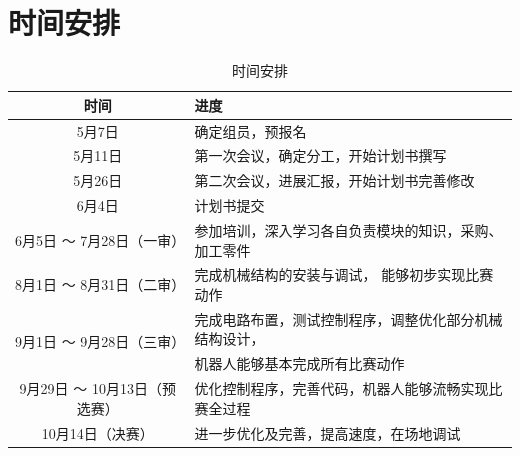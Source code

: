 \documentclass[10pt]{ctexart}
\begin{document}
\clearpage
\section{时间安排}

\begin{table}[H]
    \centering
    \caption{时间安排}
    \begin{tabular}{cl}
        \toprule
        时间                                   & {\centering 进度}             \\
        \midrule
        5月7日                                 & 确定组员，预报名                    \\
        5月11日                                & 第一次会议，确定分工，开始计划书撰写          \\
        5月26日                                & 第二次会议，进展汇报，开始计划书完善修改        \\
        6月4日                                 & 计划书提交                       \\
        6月5日 ～ 7月28日（一审）                     & 参加培训，深入学习各自负责模块的知识，采购、加工零件  \\
        8月1日 ～ 8月31日（二审）                     & 完成机械结构的安装与调试， 能够初步实现比赛动作    \\
        \multirow{2}[0]{*}{9月1日 ～ 9月28日（三审）} & 完成电路布置，测试控制程序，调整优化部分机械结构设计， \\
                                             & 机器人能够基本完成所有比赛动作             \\
        9月29日 ～ 10月13日（预选赛）                  & 优化控制程序，完善代码，机器人能够流畅实现比赛全过程  \\
        10月14日（决赛）                           & 进一步优化及完善，提高速度，在场地调试         \\
        \bottomrule
    \end{tabular}
    \label{tab:timeline}
\end{table}
\end{document}
